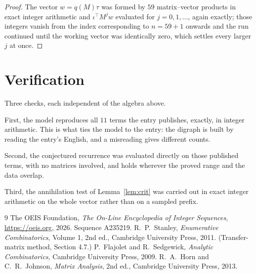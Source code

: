 \documentclass[11pt,a4paper]{article}
\theoremstyle{plain}
\theoremstyle{definition}
\begin{document}
\begin{proof}
The vector $w=q(M)\tau$ was formed by $59$ matrix--vector products in exact integer
arithmetic and $\iota^{\!\top}M^{j}w$ evaluated for $j=0,1,\dots$, again exactly; those
integers vanish from the index corresponding to $n=59+1$ onwards and the run continued
until the working vector was identically zero, which settles every larger $j$ at once.
\end{proof}

\section{Verification}

Three checks, each independent of the algebra above.

First, the model reproduces all $11$ terms the entry publishes, exactly, in integer
arithmetic. This is what ties the model to the entry: the digraph is built by reading the
entry's English, and a misreading gives different counts.

Second, the conjectured recurrence was evaluated directly on those published terms, with no
matrices involved, and holds wherever the proved range and the data overlap.

Third, the annihilation test of Lemma~\ref{lem:crit} was carried out in exact integer
arithmetic on the whole vector rather than on a sampled prefix.

\begin{thebibliography}{9}
 The OEIS Foundation, \emph{The On-Line Encyclopedia of Integer
Sequences}, \url{https://oeis.org}, 2026. Sequence A235219.
 R.~P.~Stanley, \emph{Enumerative Combinatorics}, Volume 1, 2nd ed.,
Cambridge University Press, 2011. (Transfer-matrix method, Section 4.7.)
 P.~Flajolet and R.~Sedgewick, \emph{Analytic Combinatorics}, Cambridge
University Press, 2009.
 R.~A.~Horn and C.~R.~Johnson, \emph{Matrix Analysis}, 2nd ed., Cambridge
University Press, 2013.
\end{thebibliography}
\end{document}
